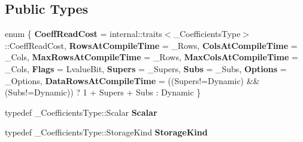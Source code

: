\subsection*{Public Types}
\begin{DoxyCompactItemize}
\item 
\mbox{\label{struct_eigen_1_1internal_1_1traits_3_01_band_matrix_wrapper_3_01___coefficients_type_00_01___row768e2717402a9eceb38d536f65ceb4f1_ad705c0a494d41444264cf612700d1c9f}} 
enum \{ \newline
{\bfseries Coeff\+Read\+Cost} = internal\+::traits$<$\+\_\+\+Coefficients\+Type$>$\+::Coeff\+Read\+Cost, 
{\bfseries Rows\+At\+Compile\+Time} = \+\_\+\+Rows, 
{\bfseries Cols\+At\+Compile\+Time} = \+\_\+\+Cols, 
{\bfseries Max\+Rows\+At\+Compile\+Time} = \+\_\+\+Rows, 
\newline
{\bfseries Max\+Cols\+At\+Compile\+Time} = \+\_\+\+Cols, 
{\bfseries Flags} = Lvalue\+Bit, 
{\bfseries Supers} = \+\_\+\+Supers, 
{\bfseries Subs} = \+\_\+\+Subs, 
\newline
{\bfseries Options} = \+\_\+\+Options, 
{\bfseries Data\+Rows\+At\+Compile\+Time} = ((Supers!=Dynamic) \&\& (Subs!=Dynamic)) ? 1 + Supers + Subs \+: Dynamic
 \}
\item 
\mbox{\label{struct_eigen_1_1internal_1_1traits_3_01_band_matrix_wrapper_3_01___coefficients_type_00_01___row768e2717402a9eceb38d536f65ceb4f1_a12b57a6bd016f9b429bfe5f3b3177a30}} 
typedef \+\_\+\+Coefficients\+Type\+::\+Scalar {\bfseries Scalar}
\item 
\mbox{\label{struct_eigen_1_1internal_1_1traits_3_01_band_matrix_wrapper_3_01___coefficients_type_00_01___row768e2717402a9eceb38d536f65ceb4f1_a0d05a8fe0d7c8b7d38d75e8ea658f25a}} 
typedef \+\_\+\+Coefficients\+Type\+::\+Storage\+Kind {\bfseries Storage\+Kind}
\item 
\mbox{\label{struct_eigen_1_1internal_1_1traits_3_01_band_matrix_wrapper_3_01___coefficients_type_00_01___row768e2717402a9eceb38d536f65ceb4f1_ae98a369b86b0474b2442cf1e5b3b813a}} 

\end{DoxyCompactItemize}
